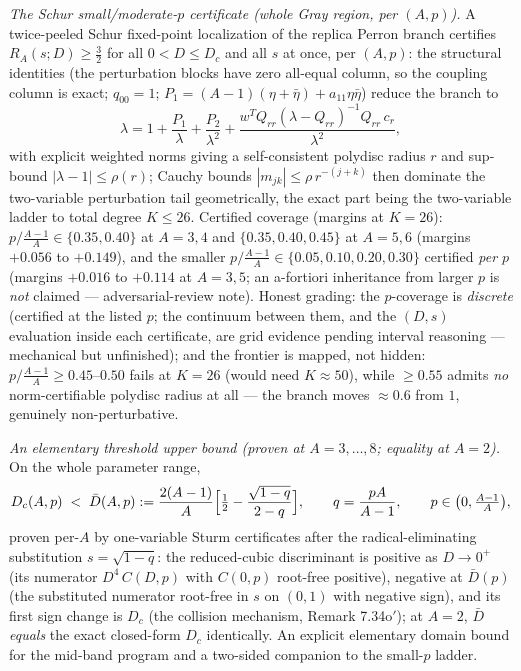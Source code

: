 \documentclass[
]{article}
\begin{document}
\emph{The Schur small/moderate-$p$ certificate (whole Gray region, per
$(A,p)$).} A twice-peeled Schur fixed-point localization of the replica Perron
branch certifies $R_A(s;D)\ge\tfrac32$ for all $0<D\le D_c$ and all $s$ at
once, per $(A,p)$: the structural identities (the perturbation blocks have
zero all-equal column, so the coupling column is exact; $q_{00}=1$;
$P_1=(A-1)(\eta+\bar\eta)+a_{11}\eta\bar\eta$) reduce the branch to
\[
  \lambda=1+\frac{P_1}{\lambda}+\frac{P_2}{\lambda^2}
  +\frac{w^TQ_{rr}(\lambda-Q_{rr})^{-1}Q_{rr}\,c_r}{\lambda^2},
\]
with explicit weighted norms giving a self-consistent polydisc radius $r$ and
sup-bound $|\lambda-1|\le\rho(r)$; Cauchy bounds $|m_{jk}|\le\rho\,r^{-(j+k)}$
then dominate the two-variable perturbation tail geometrically, the exact part
being the two-variable ladder to total degree $K\le26$. Certified coverage
(margins at $K=26$): $p\big/\tfrac{A-1}A\in\{0.35,0.40\}$ at $A=3,4$ and
$\{0.35,0.40,0.45\}$ at $A=5,6$ (margins $+0.056$ to $+0.149$), and the
smaller $p\big/\tfrac{A-1}A\in\{0.05,0.10,0.20,0.30\}$ certified \emph{per
$p$} (margins $+0.016$ to $+0.114$ at $A=3,5$; an a-fortiori inheritance from
larger $p$ is \emph{not} claimed --- adversarial-review note). Honest grading:
the $p$-coverage is \emph{discrete} (certified at the listed $p$; the
continuum between them, and the $(D,s)$ evaluation inside each certificate,
are grid evidence pending interval reasoning --- mechanical but unfinished);
and the frontier is mapped, not hidden: $p\big/\tfrac{A-1}A\ge0.45$--$0.50$
fails at $K=26$ (would need $K\approx50$), while $\ge0.55$ admits \emph{no}
norm-certifiable polydisc radius at all --- the branch moves $\approx0.6$ from
$1$, genuinely non-perturbative.

\emph{An elementary threshold upper bound (proven at $A=3,\dots,8$; equality
at $A=2$).} On the whole parameter range,
\[
  D_c(A,p)\;<\;\bar D(A,p):=\frac{2(A-1)}A
  \Bigl[\tfrac12-\frac{\sqrt{1-q}}{2-q}\Bigr],\qquad
  q=\frac{pA}{A-1},\qquad p\in\bigl(0,\tfrac{A-1}A\bigr),
\]
proven per-$A$ by one-variable Sturm certificates after the
radical-eliminating substitution $s=\sqrt{1-q}$: the reduced-cubic
discriminant is positive as $D\to0^+$ (its numerator $D^4\,C(D,p)$ with
$C(0,p)$ root-free positive), negative at $\bar D(p)$ (the substituted
numerator root-free in $s$ on $(0,1)$ with negative sign), and its first sign
change is $D_c$ (the collision mechanism, Remark 7.34o$'$); at $A=2$, $\bar D$
\emph{equals} the exact closed-form $D_c$ identically. An explicit elementary
domain bound for the mid-band program and a two-sided companion to the
small-$p$ ladder.
\end{document}
